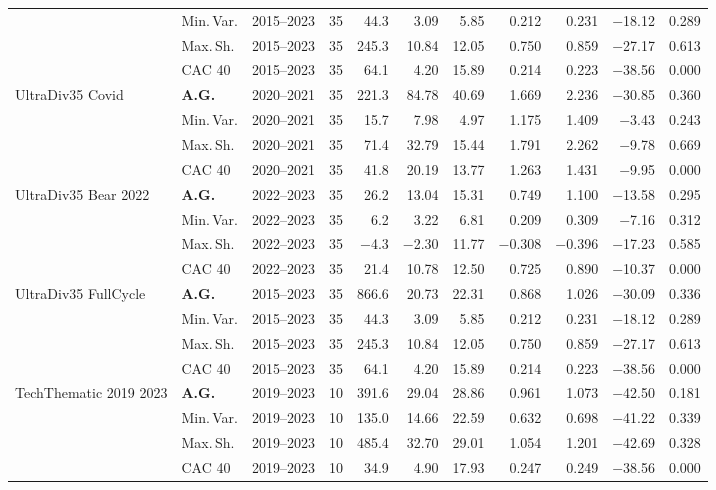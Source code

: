 \begin{longtable}{p{2.6cm} l c c r r r r r r r}
 & Min.\,Var. & 2015--2023 & 35 & 44.3 & 3.09 & 5.85 & 0.212 & 0.231 & $-$18.12 & 0.289 \\
 & Max.\,Sh. & 2015--2023 & 35 & 245.3 & 10.84 & 12.05 & 0.750 & 0.859 & $-$27.17 & 0.613 \\
 & CAC 40 & 2015--2023 & 35 & 64.1 & 4.20 & 15.89 & 0.214 & 0.223 & $-$38.56 & 0.000 \\
\midrule
UltraDiv35 Covid & \textbf{A.G.} & 2020--2021 & 35 & 221.3 & 84.78 & 40.69 & 1.669 & 2.236 & $-$30.85 & 0.360 \\
 & Min.\,Var. & 2020--2021 & 35 & 15.7 & 7.98 & 4.97 & 1.175 & 1.409 & $-$3.43 & 0.243 \\
 & Max.\,Sh. & 2020--2021 & 35 & 71.4 & 32.79 & 15.44 & 1.791 & 2.262 & $-$9.78 & 0.669 \\
 & CAC 40 & 2020--2021 & 35 & 41.8 & 20.19 & 13.77 & 1.263 & 1.431 & $-$9.95 & 0.000 \\
\midrule
UltraDiv35 Bear 2022 & \textbf{A.G.} & 2022--2023 & 35 & 26.2 & 13.04 & 15.31 & 0.749 & 1.100 & $-$13.58 & 0.295 \\
 & Min.\,Var. & 2022--2023 & 35 & 6.2 & 3.22 & 6.81 & 0.209 & 0.309 & $-$7.16 & 0.312 \\
 & Max.\,Sh. & 2022--2023 & 35 & $-$4.3 & $-$2.30 & 11.77 & $-$0.308 & $-$0.396 & $-$17.23 & 0.585 \\
 & CAC 40 & 2022--2023 & 35 & 21.4 & 10.78 & 12.50 & 0.725 & 0.890 & $-$10.37 & 0.000 \\
\midrule
UltraDiv35 FullCycle & \textbf{A.G.} & 2015--2023 & 35 & 866.6 & 20.73 & 22.31 & 0.868 & 1.026 & $-$30.09 & 0.336 \\
 & Min.\,Var. & 2015--2023 & 35 & 44.3 & 3.09 & 5.85 & 0.212 & 0.231 & $-$18.12 & 0.289 \\
 & Max.\,Sh. & 2015--2023 & 35 & 245.3 & 10.84 & 12.05 & 0.750 & 0.859 & $-$27.17 & 0.613 \\
 & CAC 40 & 2015--2023 & 35 & 64.1 & 4.20 & 15.89 & 0.214 & 0.223 & $-$38.56 & 0.000 \\
\midrule
TechThematic 2019 2023 & \textbf{A.G.} & 2019--2023 & 10 & 391.6 & 29.04 & 28.86 & 0.961 & 1.073 & $-$42.50 & 0.181 \\
 & Min.\,Var. & 2019--2023 & 10 & 135.0 & 14.66 & 22.59 & 0.632 & 0.698 & $-$41.22 & 0.339 \\
 & Max.\,Sh. & 2019--2023 & 10 & 485.4 & 32.70 & 29.01 & 1.054 & 1.201 & $-$42.69 & 0.328 \\
 & CAC 40 & 2019--2023 & 10 & 34.9 & 4.90 & 17.93 & 0.247 & 0.249 & $-$38.56 & 0.000 \\

\end{longtable}
